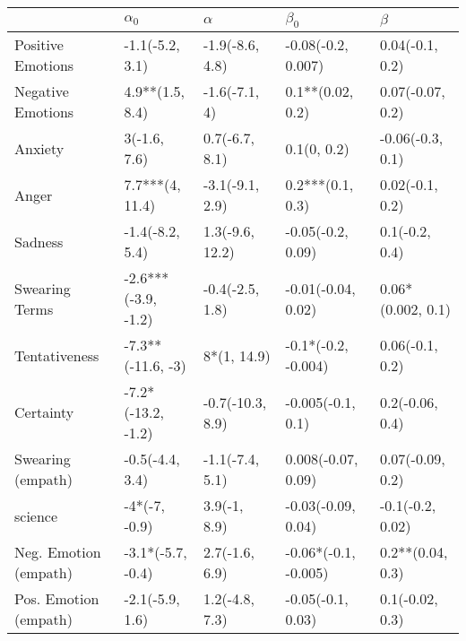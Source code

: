 \begin{tabular}{lllll}
\toprule
{} &           $\alpha_0$ &          $\alpha$ &             $\beta_0$ &            $\beta$ \\
\midrule
Positive Emotions     &      -1.1(-5.2, 3.1) &   -1.9(-8.6, 4.8) &    -0.08(-0.2, 0.007) &    0.04(-0.1, 0.2) \\
Negative Emotions     &      4.9**(1.5, 8.4) &     -1.6(-7.1, 4) &      0.1**(0.02, 0.2) &   0.07(-0.07, 0.2) \\
Anxiety               &         3(-1.6, 7.6) &    0.7(-6.7, 8.1) &           0.1(0, 0.2) &   -0.06(-0.3, 0.1) \\
Anger                 &      7.7***(4, 11.4) &   -3.1(-9.1, 2.9) &      0.2***(0.1, 0.3) &    0.02(-0.1, 0.2) \\
Sadness               &      -1.4(-8.2, 5.4) &   1.3(-9.6, 12.2) &     -0.05(-0.2, 0.09) &     0.1(-0.2, 0.4) \\
Swearing Terms        &  -2.6***(-3.9, -1.2) &   -0.4(-2.5, 1.8) &    -0.01(-0.04, 0.02) &  0.06*(0.002, 0.1) \\
Tentativeness         &    -7.3**(-11.6, -3) &       8*(1, 14.9) &   -0.1*(-0.2, -0.004) &    0.06(-0.1, 0.2) \\
Certainty             &   -7.2*(-13.2, -1.2) &  -0.7(-10.3, 8.9) &     -0.005(-0.1, 0.1) &    0.2(-0.06, 0.4) \\
Swearing (empath)     &      -0.5(-4.4, 3.4) &   -1.1(-7.4, 5.1) &    0.008(-0.07, 0.09) &   0.07(-0.09, 0.2) \\
science               &        -4*(-7, -0.9) &      3.9(-1, 8.9) &    -0.03(-0.09, 0.04) &   -0.1(-0.2, 0.02) \\
Neg. Emotion (empath) &    -3.1*(-5.7, -0.4) &    2.7(-1.6, 6.9) &  -0.06*(-0.1, -0.005) &   0.2**(0.04, 0.3) \\
Pos. Emotion (empath) &      -2.1(-5.9, 1.6) &    1.2(-4.8, 7.3) &     -0.05(-0.1, 0.03) &    0.1(-0.02, 0.3) \\
\bottomrule
\end{tabular}
